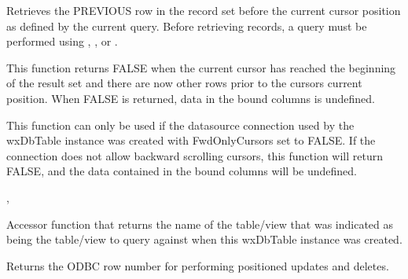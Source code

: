 


\label{wxdbtablegetprev}


Retrieves the PREVIOUS row in the record set before the current cursor 
position as defined by the current query.  Before retrieving records, a 
query must be performed using , 
, 
 or 
.


This function returns FALSE when the current cursor has reached the beginning 
of the result set and there are now other rows prior to the cursors current 
position.  When FALSE is returned, data in the bound columns is undefined.


This function can only be used if the datasource connection used by the 
wxDbTable instance was created with FwdOnlyCursors set to FALSE.  If the 
connection does not allow backward scrolling cursors, this function will 
return FALSE, and the data contained in the bound columns will be undefined.


, 


\label{wxdbtablegetquerytablename}


Accessor function that returns the name of the table/view that was indicated 
as being the table/view to query against when this wxDbTable instance was 
created.




\label{wxdbtablegetrownum}


Returns the ODBC row number for performing positioned updates and deletes.  


